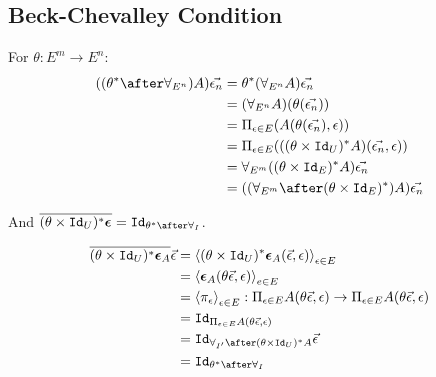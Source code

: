 \documentclass{report}
\begin{document}
\subsection{Beck-Chevalley Condition}

For $\theta: E^m \rightarrow E^n$:
\begin{align}
    ((\theta\star\after\allEn)A)\env &= \theta\star(\allEn A)\env\\
    &= (\allEn A)(\theta(\env))\\
    &= \Pi_{\e\in E}(A(\theta(\env), \e))\\
    &= \Pi_{\e\in E}(((\theta\times \Id{U})\star A)(\env, \e))\\
    &= \allEm((\theta\times\Id{E})\star A)\env\\
    &= ((\allEm\after(\theta\times\Id{E})\star)A)\env
\end{align}

And $\bar{(\theta\times\Id{U})\star \counit{}} = \Id{\theta\star\after\allI}$.

\begin{align}
    \bar{(\theta\times\Id{U})\star \counit{A}} \ev  & = \finpr{(\theta\times\Id{U})\star\counit{A}(\ev, \e)}{\e\in E}\\
    & = \finpr{\counit{A}(\theta\ev, \e)}{e\in E}\\
    & = \finpr{\pi_\e}{\e\in E}: \Pi_{\e\in E}A(\theta\ev, \e) \rightarrow \Pi_{\e\in E}A(\theta\ev, \e)\\
    & = \Id{\Pi_{\e\in E}A(\theta\ev, \e)}\\
    & = \Id{\allII\after(\theta\times\Id{U})\star A}\ev\\
    & = \Id{\theta\star\after\allI}
\end{align}
\end{document}
